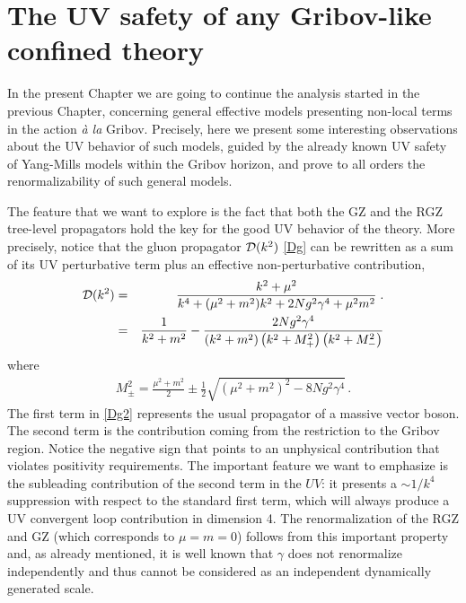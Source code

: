 \chapter{The UV safety of any Gribov-like confined theory}
\label{UVpropsofconfiningprop}

In the present Chapter we are going to continue the analysis started in the previous Chapter,
concerning general effective models presenting non-local terms in the action \emph{\`a la}
Gribov. Precisely, here we present some interesting observations about the UV behavior of such
models, guided by the already known UV safety of Yang-Mills models within the Gribov horizon,
and prove to all orders the renormalizability of such general models.

The feature that we want to explore is the fact that both the GZ and the RGZ
tree-level propagators hold the key for the good UV behavior of the theory. More precisely,
notice that the gluon propagator ${\cal D}(k^2)$ \eqref{Dg} can be rewritten as a sum of its UV
perturbative term plus an effective non-perturbative contribution,
 \begin{eqnarray} 
{\cal D}(k^2) & = & \frac{k^2 +\mu^2}{k^4 + (\mu^2+m^2)k^2 + 2Ng^2\gamma^4 + \mu^2 m^2}  \;.\nonumber\\ 
& = &  \frac{1}{k^2 +  m^2} - \frac{2Ng^2\gamma^4}{\left(k^2 +  m^2\right)\left(k^2 +  M_{+}^2\right)\left(k^2 +  M_{-}^2\right)}
\label{Dg2}
\end{eqnarray}
where
\begin{eqnarray} 
M^2_{\pm}= \frac{\mu^2 + m^2}{2} \pm \frac 12 \sqrt{\left(\mu^2 + m^2 \right)^2 -
8Ng^2\gamma^4} \,.
\label{masses1}
\end{eqnarray}
The first term in \eqref{Dg2} represents the usual propagator of a massive vector boson. The
second term is the contribution coming from the restriction to the Gribov region. Notice the
negative sign that points to an unphysical contribution that violates positivity requirements.
The important feature we want to emphasize is the subleading contribution of the second term in
the $UV$: it presents a $\sim 1/k^4$ suppression with respect to the standard first term, which
will always produce a UV convergent loop contribution in dimension 4. The renormalization of
the RGZ and GZ (which corresponds to $\mu = m =0$) follows from this important property and, as
already mentioned, it is well known that $\gamma$ does not renormalize independently and thus
cannot be considered as an independent dynamically generated scale.

